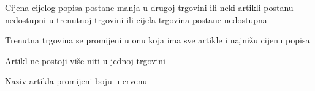 \begin{packed_item}
\begin{packed_item}
						\item[4.a] Cijena cijelog popisa postane manja u drugoj trgovini ili neki artikli postanu nedostupni u trenutnoj trgovini ili cijela trgovina postane nedostupna
						\item[] \begin{packed_enum}
							\item Trenutna trgovina se promijeni u onu koja ima sve artikle i najnižu cijenu popisa
						\end{packed_enum}
						\item[4.b] Artikl ne postoji više niti u jednoj trgovini
						\item[] \begin{packed_enum}
							\item Naziv artikla promijeni boju u crvenu
						\end{packed_enum}
					\end{packed_item}
				\end{packed_item}
			
